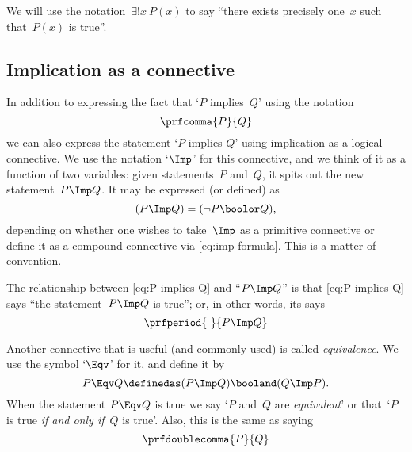 We will use the notation~$\exists!
    x \ P(x)$ to say ``there exists precisely one~$x$ such that~$P(x)$ is true''.

\subsection{Implication as a connective}

In addition to expressing the fact that `$P$ implies~$Q$' using the notation
\begin{equation}
    \label{eq:P-implies-Q}
    \prfcomma
    {P}{Q}
\end{equation}
we can also express the statement `$P$ implies $Q$' using implication as a logical connective.
We use the notation `$\Imp$' for this connective, and we think of it as a function of two variables:
given statements~$P$ and~$Q$, it spits out the new statement~$P \Imp Q$.
It may be expressed (or defined) as
\begin{equation}
    \label{eq:imp-formula}
    (P \Imp Q) = (\lnot P \boolor Q),
\end{equation}
depending on whether one wishes to take~$\Imp$ as a primitive connective or define it as a compound connective via \cref{eq:imp-formula}.
This is a matter of convention.

The relationship between \cref{eq:P-implies-Q} and ``$P \Imp Q$'' is that  \cref{eq:P-implies-Q} says ``the statement~$P \Imp Q$ is true''; or, in other words, its says
\begin{equation}
    \prfperiod
    {\ }{P \Imp Q}
\end{equation}

Another connective that is useful (and commonly used) is called \emph{equivalence}.
We use the symbol `$\Eqv$' for it, and define it by
\begin{equation}
    P \Eqv Q \definedas (P \Imp Q) \booland (Q \Imp P).
\end{equation}
When the statement $P \Eqv Q$ is true we say `$P$ and~$Q$ are \emph{equivalent}' or that~`$P$ is true \emph{if and only if}~$Q$ is true'.
Also, this is the same as saying
\begin{equation}
    \prfdoublecomma{
        P
    }{
        Q
    }
\end{equation}
